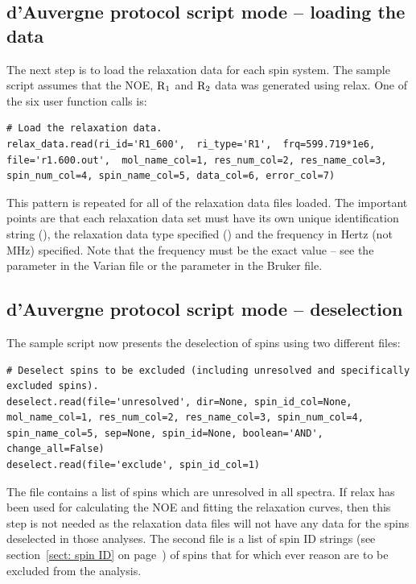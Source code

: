 
\subsection{d'Auvergne protocol script mode -- loading the data}

The next step is to load the relaxation data for each spin system.
The sample script assumes that the NOE, $\mathrm{R}_1$ and $\mathrm{R}_2$ data was generated using relax.
One of the six user function calls is:

\begin{lstlisting}[firstnumber=180]
# Load the relaxation data.
relax_data.read(ri_id='R1_600',  ri_type='R1',  frq=599.719*1e6, file='r1.600.out',  mol_name_col=1, res_num_col=2, res_name_col=3, spin_num_col=4, spin_name_col=5, data_col=6, error_col=7)
\end{lstlisting}

This pattern is repeated for all of the relaxation data files loaded.
The important points are that each relaxation data set must have its own unique identification string (), the relaxation data type specified () and the frequency in Hertz (not MHz) specified.
Note that the frequency must be the exact value -- see the  parameter in the Varian  file or the  parameter in the Bruker  file.



\subsection{d'Auvergne protocol script mode -- deselection}

The sample script now presents the deselection of spins using two different files:

\begin{lstlisting}[firstnumber=188]
# Deselect spins to be excluded (including unresolved and specifically excluded spins).
deselect.read(file='unresolved', dir=None, spin_id_col=None, mol_name_col=1, res_num_col=2, res_name_col=3, spin_num_col=4, spin_name_col=5, sep=None, spin_id=None, boolean='AND', change_all=False)
deselect.read(file='exclude', spin_id_col=1)
\end{lstlisting}

The  file contains a list of spins which are unresolved in all spectra.
If relax has been used for calculating the NOE and fitting the relaxation curves, then this step is not needed as the relaxation data files will not have any data for the spins deselected in those analyses.
The second file  is a list of spin ID strings (see section~\ref{sect: spin ID} on page~\pageref{sect: spin ID}) of spins that for which ever reason are to be excluded from the analysis.


